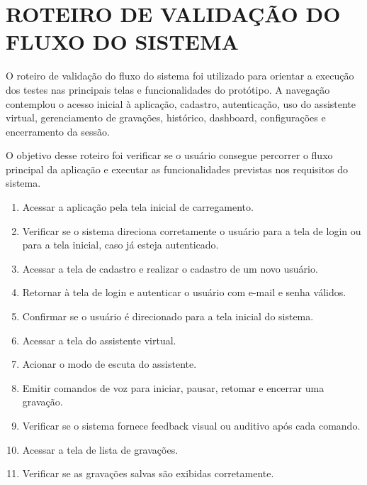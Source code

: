 \documentclass[12pt,oneside,a4paper,brazil,final]{abntex2}
\begin{document}
\section{ROTEIRO DE VALIDAÇÃO DO FLUXO DO SISTEMA}


O roteiro de validação do fluxo do sistema foi utilizado para orientar a execução dos testes nas principais telas e funcionalidades do protótipo. A navegação contemplou o acesso inicial à aplicação, cadastro, autenticação, uso do assistente virtual, gerenciamento de gravações, histórico, dashboard, configurações e encerramento da sessão.

O objetivo desse roteiro foi verificar se o usuário consegue percorrer o fluxo principal da aplicação e executar as funcionalidades previstas nos requisitos do sistema.


\begin{enumerate}

    \item Acessar a aplicação pela tela inicial de carregamento.

    \item Verificar se o sistema direciona corretamente o usuário para a tela de login ou para a tela inicial, caso já esteja autenticado.

    \item Acessar a tela de cadastro e realizar o cadastro de um novo usuário.

    \item Retornar à tela de login e autenticar o usuário com e-mail e senha válidos.

    \item Confirmar se o usuário é direcionado para a tela inicial do sistema.

    \item Acessar a tela do assistente virtual.

    \item Acionar o modo de escuta do assistente.

    \item Emitir comandos de voz para iniciar, pausar, retomar e encerrar uma gravação.

    \item Verificar se o sistema fornece feedback visual ou auditivo após cada comando.

    \item Acessar a tela de lista de gravações.

    \item Verificar se as gravações salvas são exibidas corretamente.


\end{enumerate}
\end{document}
